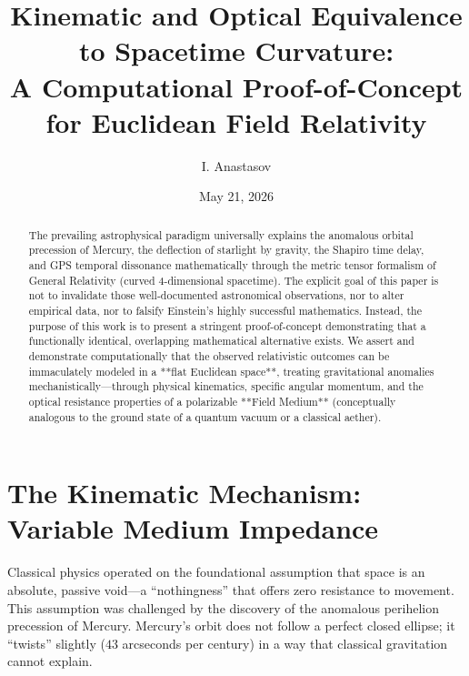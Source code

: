\documentclass[reprint,amsmath,amssymb,aps,prd,twocolumn]{revtex4-2}
\begin{document}
\title{Kinematic and Optical Equivalence to Spacetime Curvature:\\A Computational Proof-of-Concept for Euclidean Field Relativity}

\author{I. Anastasov \texorpdfstring{\href{https://github.com/rt20bg/Anastasov_Theory}{\faGithub}}{}}
\date{May 21, 2026}

\begin{abstract}
The prevailing astrophysical paradigm universally explains the anomalous orbital precession of Mercury, the deflection of starlight by gravity, the Shapiro time delay, and GPS temporal dissonance mathematically through the metric tensor formalism of General Relativity (curved 4-dimensional spacetime). The explicit goal of this paper is not to invalidate those well-documented astronomical observations, nor to alter empirical data, nor to falsify Einstein's highly successful mathematics. Instead, the purpose of this work is to present a stringent proof-of-concept demonstrating that a functionally identical, overlapping mathematical alternative exists. We assert and demonstrate computationally that the observed relativistic outcomes can be immaculately modeled in a **flat Euclidean space**, treating gravitational anomalies mechanistically---through physical kinematics, specific angular momentum, and the optical resistance properties of a polarizable **Field Medium** (conceptually analogous to the ground state of a quantum vacuum or a classical aether).

\end{abstract}

\maketitle

\section{The Kinematic Mechanism: Variable Medium Impedance}

Classical physics operated on the foundational assumption that space is an absolute, passive void---a ``nothingness'' that offers zero resistance to movement. This assumption was challenged by the discovery of the anomalous perihelion precession of Mercury. Mercury's orbit does not follow a perfect closed ellipse; it ``twists'' slightly ($43$ arcseconds per century) in a way that classical gravitation cannot explain.
\end{document}
